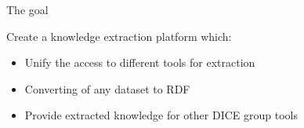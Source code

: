 \begin{frame}{The goal}

Create a knowledge extraction platform which:

\begin{itemize}
	\item Unify the access to different tools for extraction 
	\item Converting of any dataset to RDF
	\item Provide extracted knowledge for other DICE group tools
\end{itemize}

\end{frame}